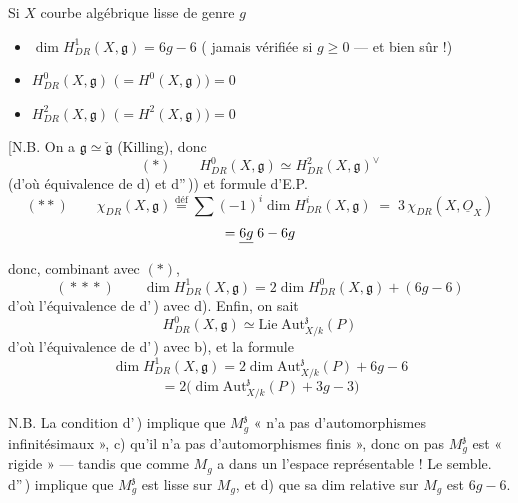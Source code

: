 \documentclass[11pt,a4paper]{article}
\begin{document}
\ill{} Si $X$ courbe algébrique  lisse \ill{} de genre $g$
\ill{} \struck{\ill{}}
\begin{itemize}
  \item[d)] $\dim H^1_{DR}(X, \mathfrak{g}) = 6g - 6$ \struck{\ill{}}
  (\ill{} jamais vérifiée si $g \geqslant 0$ --- et bien sûr !)
  \item[d')] $H^0_{DR}(X, \mathfrak{g})$ $\big( = H^0(X, \mathfrak{g})\big)
  = 0$
  \item[d'')] $H^2_{DR}(X, \mathfrak{g})$ $\big( = H^2(X, \mathfrak{g})\big)
  = 0$
\end{itemize}

[N.B. On a $\mathfrak{g} \simeq \check{\mathfrak{g}}$ (Killing), donc
\[
  (*) \qquad H^0_{DR}(X, \mathfrak{g}) \simeq
  H^2_{DR}(X, \mathfrak{g})^{\vee}
\]
(d'où équivalence de d) et d''\,)) et formule d'E.P.
\[
  (**) \qquad \chi_{DR}(X, \mathfrak{g})
  \overset{\text{déf}}{=} \sum (-1)^i \dim H^i_{DR}(X, \mathfrak{g})
  \;=\; 3\, \chi_{DR}(X, \underline{O}_X)
\]
\[
  = \struck{6g} \; 6 - 6g
\]
donc, combinant avec $(*)$,
\[
  (\!*\!*\!*) \qquad \dim H^1_{DR}(X, \mathfrak{g})
  = 2 \dim H^0_{DR}(X, \mathfrak{g}) + (6g - 6)
\]
d'où l'équivalence de d'\,) avec d). Enfin, on sait
\[
  H^0_{DR}(X, \mathfrak{g}) \simeq \mathrm{Lie}\;
  \mathrm{Aut}^{\mathfrak{z}}_{X/k}(P)
\]
d'où l'équivalence de d'\,) avec b), et la formule \ill{}
\[
  \dim H^1_{DR}(X, \mathfrak{g}) = 2 \dim
  \mathrm{Aut}^{\mathfrak{z}}_{X/k}(P) + 6g - 6
\]
\[
  = 2 \Big( \dim \mathrm{Aut}^{\mathfrak{z}}_{X/k}(P) + 3g - 3 \Big)
\]

N.B. La condition d'\,) implique que $M_g^{\mathfrak{z}}$ « n'a pas
d'automorphismes infinitésimaux », c) qu'il n'a pas d'automorphismes finis »,
donc on \ill{} pas $M_g^{\mathfrak{z}}$ est « rigide » --- tandis que comme
$M_g$ a \ill{} dans un l'espace représentable ! Le semble. d''\,) implique
que $M_g^{\mathfrak{z}}$ est  lisse sur $M_g$, et d)
que sa dim relative sur $M_g$ est $6g - 6$.

\end{document}

